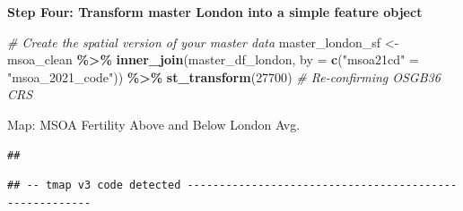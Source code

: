 \documentclass[
]{article}
\newenvironment{Shaded}{\begin{snugshade}}{\end{snugshade}}
\newcommand{\AttributeTok}[1]{\textcolor[rgb]{0.13,0.29,0.53}{#1}}
\newcommand{\CommentTok}[1]{\textcolor[rgb]{0.56,0.35,0.01}{\textit{#1}}}
\newcommand{\ConstantTok}[1]{\textcolor[rgb]{0.56,0.35,0.01}{#1}}
\newcommand{\DecValTok}[1]{\textcolor[rgb]{0.00,0.00,0.81}{#1}}
\newcommand{\FunctionTok}[1]{\textcolor[rgb]{0.13,0.29,0.53}{\textbf{#1}}}
\newcommand{\NormalTok}[1]{#1}
\newcommand{\OtherTok}[1]{\textcolor[rgb]{0.56,0.35,0.01}{#1}}
\newcommand{\SpecialCharTok}[1]{\textcolor[rgb]{0.81,0.36,0.00}{\textbf{#1}}}
\newcommand{\StringTok}[1]{\textcolor[rgb]{0.31,0.60,0.02}{#1}}
\begin{document}
\textbf{Step Four: Transform master London into a simple feature object}

\begin{Shaded}
\begin{Highlighting}[]
\CommentTok{\# Create the spatial version of your master data}
\NormalTok{master\_london\_sf }\OtherTok{\textless{}{-}}\NormalTok{ msoa\_clean }\SpecialCharTok{\%\textgreater{}\%}
  \FunctionTok{inner\_join}\NormalTok{(master\_df\_london, }\AttributeTok{by =} \FunctionTok{c}\NormalTok{(}\StringTok{"msoa21cd"} \OtherTok{=} \StringTok{"msoa\_2021\_code"}\NormalTok{)) }\SpecialCharTok{\%\textgreater{}\%}
  \FunctionTok{st\_transform}\NormalTok{(}\DecValTok{27700}\NormalTok{) }\CommentTok{\# Re{-}confirming OSGB36 CRS}
\end{Highlighting}
\end{Shaded}

Map: MSOA Fertility Above and Below London Avg.

\begin{Shaded}
\end{Shaded}

\begin{verbatim}
## 
\end{verbatim}

\begin{verbatim}
## -- tmap v3 code detected -------------------------------------------------------
\end{verbatim}
\end{document}
